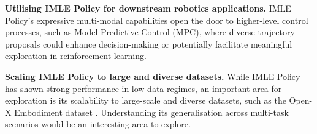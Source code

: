 \textbf{Utilising IMLE Policy for downstream robotics applications.} IMLE Policy’s expressive multi-modal capabilities open the door to higher-level control processes, such as Model Predictive Control (MPC), where diverse trajectory proposals could enhance decision-making or potentially facilitate meaningful exploration in reinforcement learning.

\textbf{Scaling IMLE Policy to large and diverse datasets.} While IMLE Policy has shown strong performance in low-data regimes, an important area for exploration is its scalability to large-scale and diverse datasets, such as the Open-X Embodiment dataset \cite{o2024open}. Understanding its generalisation across multi-task scenarios would be an interesting area to explore.







